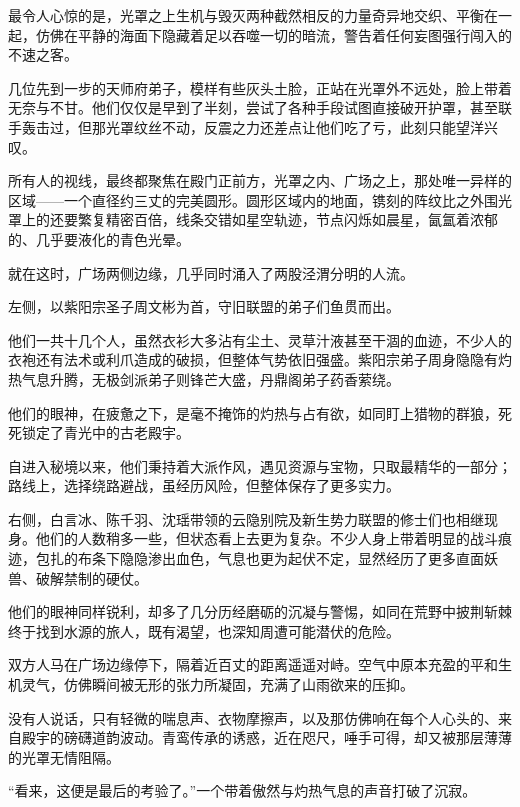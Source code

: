 最令人心惊的是，光罩之上生机与毁灭两种截然相反的力量奇异地交织、平衡在一起，仿佛在平静的海面下隐藏着足以吞噬一切的暗流，警告着任何妄图强行闯入的不速之客。

\vspace{2em}

几位先到一步的天师府弟子，模样有些灰头土脸，正站在光罩外不远处，脸上带着无奈与不甘。他们仅仅是早到了半刻，尝试了各种手段试图直接破开护罩，甚至联手轰击过，但那光罩纹丝不动，反震之力还差点让他们吃了亏，此刻只能望洋兴叹。

所有人的视线，最终都聚焦在殿门正前方，光罩之内、广场之上，那处唯一异样的区域——一个直径约三丈的完美圆形。圆形区域内的地面，镌刻的阵纹比之外围光罩上的还要繁复精密百倍，线条交错如星空轨迹，节点闪烁如晨星，氤氲着浓郁的、几乎要液化的青色光晕。

就在这时，广场两侧边缘，几乎同时涌入了两股泾渭分明的人流。

左侧，以紫阳宗圣子周文彬为首，守旧联盟的弟子们鱼贯而出。

他们一共十几个人，虽然衣衫大多沾有尘土、灵草汁液甚至干涸的血迹，不少人的衣袍还有法术或利爪造成的破损，但整体气势依旧强盛。紫阳宗弟子周身隐隐有灼热气息升腾，无极剑派弟子则锋芒大盛，丹鼎阁弟子药香萦绕。

他们的眼神，在疲惫之下，是毫不掩饰的灼热与占有欲，如同盯上猎物的群狼，死死锁定了青光中的古老殿宇。

自进入秘境以来，他们秉持着大派作风，遇见资源与宝物，只取最精华的一部分；路线上，选择绕路避战，虽经历风险，但整体保存了更多实力。

右侧，白言冰、陈千羽、沈瑶带领的云隐别院及新生势力联盟的修士们也相继现身。他们的人数稍多一些，但状态看上去更为复杂。不少人身上带着明显的战斗痕迹，包扎的布条下隐隐渗出血色，气息也更为起伏不定，显然经历了更多直面妖兽、破解禁制的硬仗。

他们的眼神同样锐利，却多了几分历经磨砺的沉凝与警惕，如同在荒野中披荆斩棘终于找到水源的旅人，既有渴望，也深知周遭可能潜伏的危险。

\vspace{2em}

双方人马在广场边缘停下，隔着近百丈的距离遥遥对峙。空气中原本充盈的平和生机灵气，仿佛瞬间被无形的张力所凝固，充满了山雨欲来的压抑。

没有人说话，只有轻微的喘息声、衣物摩擦声，以及那仿佛响在每个人心头的、来自殿宇的磅礴道韵波动。青鸾传承的诱惑，近在咫尺，唾手可得，却又被那层薄薄的光罩无情阻隔。

“看来，这便是最后的考验了。”一个带着傲然与灼热气息的声音打破了沉寂。


